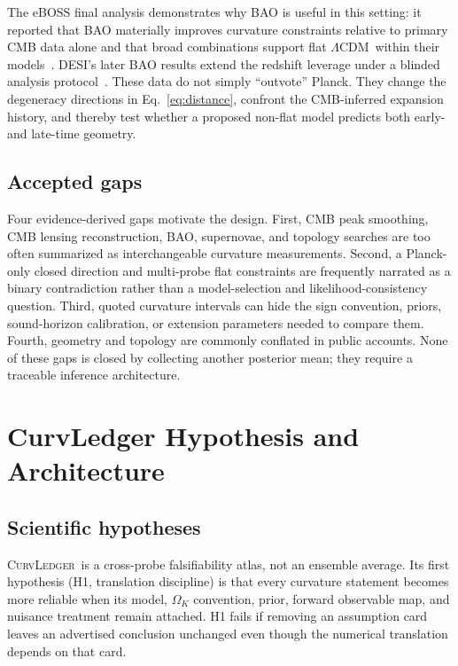 \documentclass[conference]{IEEEtran}
\newcommand{\ok}{\ensuremath{\Omega_K}}
\newcommand{\lcdm}{\ensuremath{\Lambda\mathrm{CDM}}}
\newcommand{\curvledger}{\textsc{CurvLedger}}
\begin{document}
The eBOSS final analysis demonstrates why BAO is useful in this setting: it reported that BAO materially improves curvature constraints relative to primary CMB data alone and that broad combinations support flat \lcdm\ within their models~\cite{eboss21}. DESI's later BAO results extend the redshift leverage under a blinded analysis protocol~\cite{desi25}. These data do not simply ``outvote'' Planck. They change the degeneracy directions in Eq.~\eqref{eq:distance}, confront the CMB-inferred expansion history, and thereby test whether a proposed non-flat model predicts both early- and late-time geometry.

\subsection{Accepted gaps}

Four evidence-derived gaps motivate the design. First, CMB peak smoothing, CMB lensing reconstruction, BAO, supernovae, and topology searches are too often summarized as interchangeable curvature measurements. Second, a Planck-only closed direction and multi-probe flat constraints are frequently narrated as a binary contradiction rather than a model-selection and likelihood-consistency question. Third, quoted curvature intervals can hide the sign convention, priors, sound-horizon calibration, or extension parameters needed to compare them. Fourth, geometry and topology are commonly conflated in public accounts. None of these gaps is closed by collecting another posterior mean; they require a traceable inference architecture.

\section{CurvLedger Hypothesis and Architecture}

\subsection{Scientific hypotheses}

\curvledger\ is a cross-probe falsifiability atlas, not an ensemble average. Its first hypothesis (H1, translation discipline) is that every curvature statement becomes more reliable when its model, $\ok$ convention, prior, forward observable map, and nuisance treatment remain attached. H1 fails if removing an assumption card leaves an advertised conclusion unchanged even though the numerical translation depends on that card.
\end{document}
